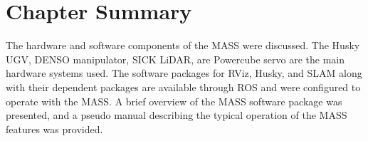 \section{Chapter Summary}

The hardware and software components of the MASS were discussed. The Husky UGV, DENSO manipulator, SICK LiDAR, are Powercube servo are the main hardware systems used. The software packages for RViz, Husky, and SLAM along with their dependent packages are available through ROS and were configured to operate with the MASS. A brief overview of the MASS software package was presented, and a pseudo manual describing the typical operation of the MASS features was provided.\\
